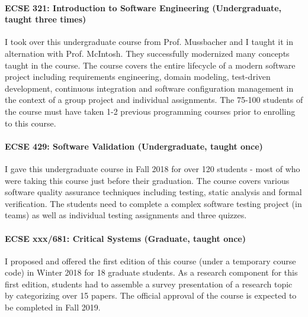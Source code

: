 \paragraph{ECSE 321: Introduction to Software Engineering (Undergraduate, taught three times)}
I took over this undergraduate course from Prof. Mussbacher and I taught it in alternation with Prof. McIntosh. They successfully modernized many concepts taught in the course. The course covers the entire lifecycle of a modern software project including requirements engineering, domain modeling, test-driven development, continuous integration and software configuration management in the context of a group project and individual assignments. The 75-100 students of the course must have taken 1-2 previous programming courses prior to enrolling to this course. 

\paragraph{ECSE 429: Software Validation (Undergraduate, taught once)}

I gave this undergraduate course in Fall 2018 for over 120 students - most of who were taking this course just before their graduation. The course covers various software quality assurance techniques including testing, static analysis and formal verification. The students need to complete a complex software testing project (in teams) as well as individual testing assignments and three quizzes.

\paragraph{ECSE xxx/681: Critical Systems (Graduate, taught once)}

I proposed and offered the first edition of this course (under a temporary course code) in Winter 2018 for 18 graduate students. As a research component for this first edition, students had to assemble a survey presentation of a research topic by categorizing over 15 papers. The official approval of the course is expected to be completed in Fall 2019. 

